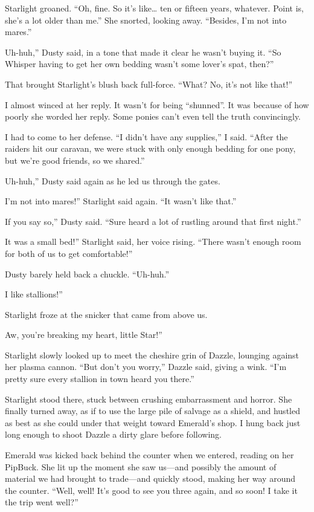 Starlight groaned. “Oh, fine. So it’s like… ten or fifteen years, whatever. Point is, she’s a lot older than me.” She snorted, looking away. “Besides, I’m not into mares.”

\leavevmode{}Uh-huh,” Dusty said, in a tone that made it clear he wasn’t buying it. “So Whisper having to get her own bedding wasn’t some lover’s spat, then?”

That brought Starlight’s blush back full-force. “What? No, it’s not like that!”

I almost winced at her reply. It wasn’t for being “shunned”. It was because of how poorly she worded her reply. Some ponies can’t even tell the truth convincingly.

I had to come to her defense. “I didn’t have any supplies,” I said. “After the raiders hit our caravan, we were stuck with only enough bedding for one pony, but we’re good friends, so we shared.”

\leavevmode{}Uh-huh,” Dusty said again as he led us through the gates.

\leavevmode{}I’m not into mares!” Starlight said again. “It wasn’t like that.”

\leavevmode{}If you say so,” Dusty said. “Sure heard a lot of rustling around that first night.”

\leavevmode{}It was a small bed!” Starlight said, her voice rising. “There wasn’t enough room for both of us to get comfortable!”

Dusty barely held back a chuckle. “Uh-huh.”

\leavevmode{}I like stallions!”

Starlight froze at the snicker that came from above us.

\leavevmode{}Aw, you’re breaking my heart, little Star!”

Starlight slowly looked up to meet the cheshire grin of Dazzle, lounging against her plasma cannon. “But don’t you worry,” Dazzle said, giving a wink. “I’m pretty sure every stallion in town heard you there.”

Starlight stood there, stuck between crushing embarrassment and horror. She finally turned away, as if to use the large pile of salvage as a shield, and hustled as best as she could under that weight toward Emerald’s shop. I hung back just long enough to shoot Dazzle a dirty glare before following.

Emerald was kicked back behind the counter when we entered, reading on her PipBuck. She lit up the moment she saw us—and possibly the amount of material we had brought to trade—and quickly stood, making her way around the counter. “Well, well! It’s good to see you three again, and so soon! I take it the trip went well?”


